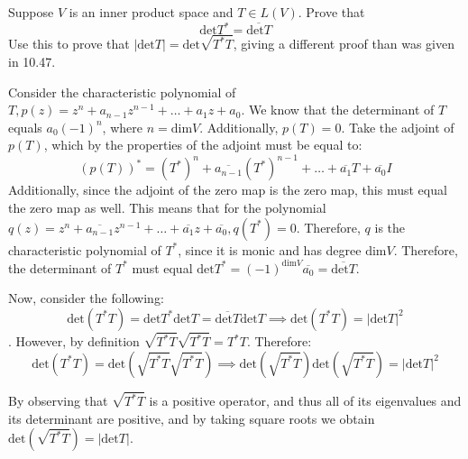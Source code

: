 \newpage
\begin{exercise}{8}
    Suppose $V$ is an inner product space and $T \in L(V)$. Prove that
    $$\text{det} T^* = \overline{\text{det} T}$$
    Use this to prove that $\lvert \text{det} T \rvert = \text{det} \sqrt{T^*T}$, giving a different proof than was given in 10.47.
\end{exercise}

\begin{solution}

    Consider the characteristic polynomial of $T, p(z) = z^n + a_{n-1}z^{n-1} + \ldots + a_1z + a_0$. We know that the determinant of $T$ equals $a_0(-1)^{n}$, where $n = \text{dim} V$. Additionally, $p(T) = 0$. Take the adjoint of $p(T)$, which by the properties of the adjoint must be equal to:
    $$(p(T))^* = (T^*)^n + \overline{a_{n-1}}(T^*)^{n-1} + \ldots + \overline{a_1}T + \overline{a_0}I$$
    Additionally, since the adjoint of the zero map is the zero map, this must equal the zero map as well. This means that for the polynomial $q(z) = z^n + \overline{a_{n-1}}z^{n-1} + \ldots + \overline{a_1}z + \overline{a_0}, q(T^*) = 0$. Therefore, $q$ is the characteristic polynomial of $T^*$, since it is monic and has degree $\text{dim} V$. Therefore, the determinant of $T^*$ must equal $\text{det} T^* = (-1)^{\text{dim}V}\overline{a_0} = \overline{\text{det} T}$.

    Now, consider the following: 
    $$\text{det}(T^*T) = \text{det} T^* \text{det} T = \overline{\text{det} T} \text{det} T \implies \text{det}(T^*T) = \lvert \text{det} T \rvert^2$$. However, by definition $\sqrt{T^*T}\sqrt{T^*T} = T^*T$. Therefore:
    $$\text{det}(T^*T) = \text{det}(\sqrt{T^*T}\sqrt{T^*T}) \implies \text{det}(\sqrt{T^*T})\text{det}({\sqrt{T^*T}}) = \lvert \text{det} T \rvert^2$$

    By observing that $\sqrt{T^*T}$ is a positive operator, and thus all of its eigenvalues and its determinant are positive, and by taking square roots we obtain $\text{det}(\sqrt{T^*T}) = \lvert \text{det} T \rvert$.

\end{solution}
